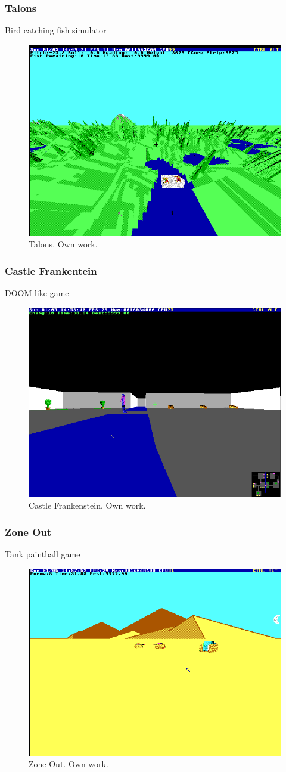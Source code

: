 \documentclass{beamer}
\begin{document}
	\begin{frame}
		\frametitle{Talons}
		Bird catching fish simulator
		\begin{figure}
			\centering
			\includegraphics[width=0.6\linewidth]{images/talons.png}
			\caption{Talons. Own work.}
			\label{fig:talons}
		\end{figure}
	\end{frame}

	\begin{frame}
		\frametitle{Castle Frankentein}
		DOOM-like game
		\begin{figure}
			\centering
			\includegraphics[width=0.6\linewidth]{images/castle_frankenstein.png}
			\caption{Castle Frankenstein. Own work.}
			\label{fig:castle_frankenstein}
		\end{figure}
	\end{frame}

	\begin{frame}
		\frametitle{Zone Out}
		Tank paintball game
		\begin{figure}
			\centering
			\includegraphics[width=0.6\linewidth]{images/zone_out.png}
			\caption{Zone Out. Own work.}
			\label{fig:zone_out}
		\end{figure}
	\end{frame}
\end{document}
